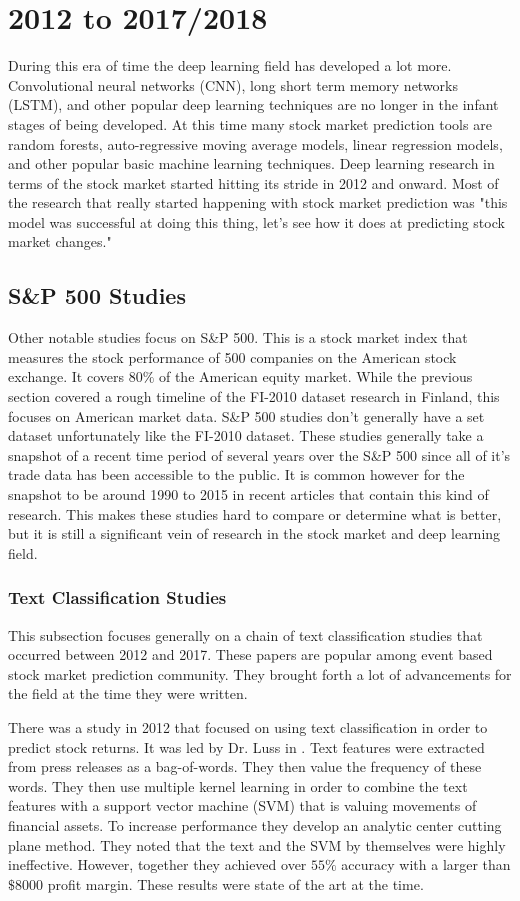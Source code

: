 \documentclass{article}
\theoremstyle{plain}
\theoremstyle{definition}
\numberwithin{equation}{section}
\numberwithin{theorem}{section}
\numberwithin{lemma}{section}
\numberwithin{definition}{section}
\numberwithin{proposition}{section}
\numberwithin{corollary}{section}
\begin{document}
	\section{2012 to 2017/2018}
	During this era of time the deep learning field has developed a lot more. Convolutional neural networks (CNN), long short term memory networks (LSTM), and other popular deep learning techniques are no longer in the infant stages of being developed. At this time many stock market prediction tools are random forests, auto-regressive moving average models, linear regression models, and other popular basic machine learning techniques. Deep learning research in terms of the stock market started hitting its stride in 2012 and onward. Most of the research that really started happening with stock market prediction was "this model was successful at doing this thing, let's see how it does at predicting stock market changes."
	
	\subsection{S\&P 500 Studies}
	Other notable studies focus on S\&P 500. This is a stock market index that measures the stock performance of 500 companies on the American stock exchange. It covers $80\%$ of the American equity market. While the previous section covered a rough timeline of the FI-2010 dataset research in Finland, this focuses on American market data. S\&P 500 studies don't generally have a set dataset unfortunately like the FI-2010 dataset. These studies generally take a snapshot of a recent time period of several years over the S\&P 500 since all of it's trade data has been accessible to the public. It is common however for the snapshot to be around 1990 to 2015 in recent articles that contain this kind of research. This makes these studies hard to compare or determine what is better, but it is still a significant vein of research in the stock market and deep learning field.
	
	
	\subsubsection{Text Classification Studies}
	This subsection focuses generally on a chain of text classification studies that occurred between 2012 and 2017. These papers are popular among event based stock market prediction community. They brought forth a lot of advancements for the field at the time they were written.
	
	
	There was a study in 2012 that focused on using text classification in order to predict stock returns. It was led by Dr. Luss in \cite{Luss2012}. Text features were extracted from press releases as a bag-of-words. They then value the frequency of these words. They then use multiple kernel learning in order to combine the text features with a support vector machine (SVM) that is valuing movements of financial assets. To increase performance they develop an analytic center cutting plane method. They noted that the text and the SVM by themselves were highly ineffective. However, together they achieved over $55\%$ accuracy with a larger than $\$8000$ profit margin. These results were state of the art at the time.
	
\end{document}
